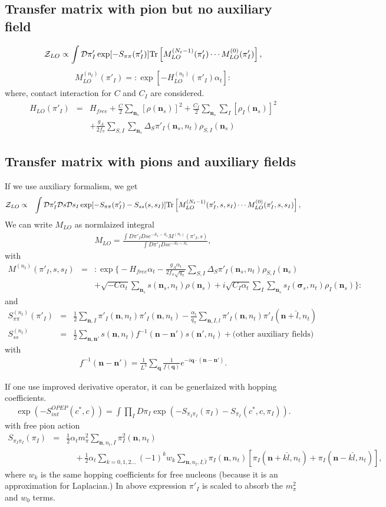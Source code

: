 \documentclass[10pt]{book}
\def\bm{\boldsymbol}
\newcommand{\bea}{\begin{eqnarray}}
\newcommand{\eea}{\end{eqnarray}}
\newcommand{\no}{\nonumber \\}
\def\vs{{\bm \sigma}}
\def\vn{{\bm n}}
\def\vq{{\bm q}}
\begin{document}
\subsection{Transfer matrix with pion but no auxiliary field} 
\bea 
{\cal Z}_{LO}\propto 
            \int {\cal D}\pi'_I \exp[-S_{\pi\pi}(\pi'_I)]{\rm Tr}\left[
                M_{LO}^{(N_t-1)}(\pi'_I)\cdots M_{LO}^{(0)}(\pi'_I)
           \right], 
\eea 
\bea 
M_{LO}^{(n_t)}(\pi'_I)=:\exp[-H_{LO}^{(n_t)}(\pi'_I)\alpha_t]:
\eea 
where, contact interaction for $C$ and $C_I$ are considered.
\bea 
H_{LO}(\pi'_I)&=& H_{free}+\frac{C}{2}\sum_{\vn_s}[\rho(\vn_s)]^2
                          +\frac{C_I}{2}\sum_{\vn_s}\sum_{I}[\rho_I(\vn_s)]^2
                    \no  & &+\frac{g_A}{2f_\pi}\sum_{S,I}\sum_{\vn_s}
                           \Delta_S \pi'_I(\vn_s,n_t)\rho_{S,I}(\vn_s)
\eea 

\subsection {Transfer matrix with pions and auxiliary fields}

If we use auxiliary formalism, we get
\bea 
{\cal Z}_{LO}&\propto &\int {\cal D}\pi'_I 
                   {\cal D}s{\cal D}s_I
            \exp[-S_{\pi\pi}(\pi'_I)-S_{ss}(s,s_I)]{\rm Tr}\left[
           M_{LO}^{(N_t-1)}(\pi'_I,s,s_I)\cdots M_{LO}^{(0)}(\pi'_I,s,s_I)
           \right],
\eea 
We can write $M_{LO}$ as normlaized integral
\bea 
M_{LO}=\frac{\int D\pi'_I D s e^{-S_\pi- S_s} M^{(n_t)}(\pi'_I,s)}
            {\int D\pi'_I D s e^{-S_\pi- S_s}},
\eea 
with
\bea             
M^{(n_t)}(\pi'_I,s,s_I)&=&:\exp\Big\{
  -H_{free}\alpha_t-\frac{g_A\alpha_t}{2f_\pi\sqrt{q_\pi}}
  \sum_{S,I}\Delta_S \pi'_I(\vn_s,n_t)\rho_{S,I}(\vn_s) \no 
 & &  +\sqrt{-C\alpha_t}\sum_{\vn_s} s(\vn_s,n_t) \rho(\vn_s)  
 +i\sqrt{C_I\alpha_t}\sum_I\sum_{\vn_s} s_I(\vs_s,n_t)\rho_I(\vn_s)
\Big\} :
\eea 
and 
\bea 
S^{(n_t)}_{\pi\pi}(\pi'_I)&=&\frac{1}{2}\sum_{\vn,I}\pi'_I(\vn,n_t)\pi'_I(\vn,n_t)
           -\frac{\alpha_t}{q_\pi}\sum_{\vn,I,l} \pi'_I(\vn,n_t)\pi'_I(\vn+\hat{l},n_t)\no 
S_{ss}^{(n_t)}&=& \frac{1}{2}\sum_{\vn,\vn'} s(\vn,n_t) f^{-1}(\vn-\vn') s(\vn',n_t)
                +\mbox{(other auxiliary fields)} 
\eea 
with 
\bea 
f^{-1}(\vn-\vn')=\frac{1}{L^3}\sum_{\vq}\frac{1}{f(\vq)} e^{-i\vq\cdot(\vn-\vn')}.
\eea 

If one use improved derivative operator, it can be generlaized with hopping coefficients.
\bea 
\exp(-S^{OPEP}_{int}(c^*,c))
=\int \prod_{I} D\pi_I \exp(-S_{\pi_I\pi_I}(\pi_I)-S_{\pi_I}(c^*,c,\pi_I)).
\eea 
with free pion action 
\bea 
S_{\pi_I\pi_I}(\pi_I)&=&\frac{1}{2}\alpha_t m_\pi^2 \sum_{\vn,n_t,I} \pi_I^2(\vn,n_t) \no 
   & &\quad +\frac{1}{2}\alpha_t \sum_{k=0,1,2\dots} (-1)^k w_k \sum_{\vn,n_t,I,\hat{l}} 
      \pi_I(\vn,n_t)\left[ \pi_I(\vn+k\hat{l},n_t)+\pi_I(\vn-k\hat{l},n_t)\right], 
\eea 
where $w_k$ is the same hopping coefficients for free nucleons (because it is an approximation for
Laplacian.)
In above expression $\pi'_I$ is scaled to absorb the $m_\pi^2$ and $w_0$ terms.
\end{document}
